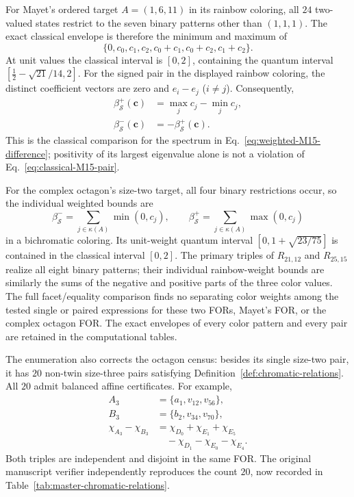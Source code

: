 \documentclass[aps,pra,reprint,superscriptaddress,longbibliography,nofootinbib,floatfix,10pt]{revtex4-2}
\theoremstyle{definition}\newtheorem{definition}[theorem]{Definition}
\theoremstyle{remark}\newtheorem{remark}[theorem]{Remark}
\newcommand{\Sc}{\mathcal S}\newcommand{\Cc}{\mathcal C}\newcommand{\Wc}{\mathcal W}
\begin{document}
For Mayet's ordered target $A=(1,6,11)$ in its rainbow coloring, all $24$ two-valued states restrict to the seven binary patterns other than $(1,1,1)$. The exact classical envelope is therefore the minimum and maximum of
\begin{equation}\label{eq:classical-M15-single}
\{0,c_0,c_1,c_2,c_0+c_1,c_0+c_2,c_1+c_2\}.
\end{equation}
At unit values the classical interval is $[0,2]$, containing the quantum interval $[\tfrac12-\sqrt{21}/14,2]$. For the signed pair in the displayed rainbow coloring, the distinct coefficient vectors are zero and $e_i-e_j$ ($i\ne j$). Consequently,
\begin{equation}\label{eq:classical-M15-pair}
\begin{aligned}
\beta^+_{\Sc}(\mathbf c)&=\max_jc_j-\min_jc_j,\\
\beta^-_{\Sc}(\mathbf c)&=-\beta^+_{\Sc}(\mathbf c).
\end{aligned}
\end{equation}
This is the classical comparison for the spectrum in Eq.~\eqref{eq:weighted-M15-difference}; positivity of its largest eigenvalue alone is not a violation of Eq.~\eqref{eq:classical-M15-pair}.

For the complex octagon's size-two target, all four binary restrictions occur, so the individual weighted bounds are
\begin{equation}\label{eq:classical-octagon-envelope}
\beta^-_{\Sc}=\sum_{j\in\kappa(A)}\min(0,c_j),\qquad
\beta^+_{\Sc}=\sum_{j\in\kappa(A)}\max(0,c_j)
\end{equation}
in a bichromatic coloring. Its unit-weight quantum interval $[0,1+\sqrt{23/75}]$ is contained in the classical interval $[0,2]$. The primary triples of $R_{21,12}$ and $R_{25,15}$ realize all eight binary patterns; their individual rainbow-weight bounds are similarly the sums of the negative and positive parts of the three color values. The full facet/equality comparison finds no separating color weights among the tested single or paired expressions for these two FORs, Mayet's FOR, or the complex octagon FOR. The exact envelopes of every color pattern and every pair are retained in the computational tables.

The enumeration also corrects the octagon census: besides its single size-two pair, it has $20$ non-twin size-three pairs satisfying Definition~\ref{def:chromatic-relations}. All $20$ admit balanced affine certificates. For example,
\begin{equation}\label{eq:octagon-size3-correction}
\begin{aligned}
A_3&=\{a_1,v_{12},v_{56}\},\\
B_3&=\{b_2,v_{34},v_{70}\},\\
\chi_{A_3}-\chi_{B_3}
&=\chi_{D_0}+\chi_{E_1}+\chi_{E_5}\\
&\quad-\chi_{D_1}-\chi_{E_0}-\chi_{E_4}.
\end{aligned}
\end{equation}
Both triples are independent and disjoint in the same FOR. The original manuscript verifier independently reproduces the count $20$, now recorded in Table~\ref{tab:master-chromatic-relations}.
\end{document}
